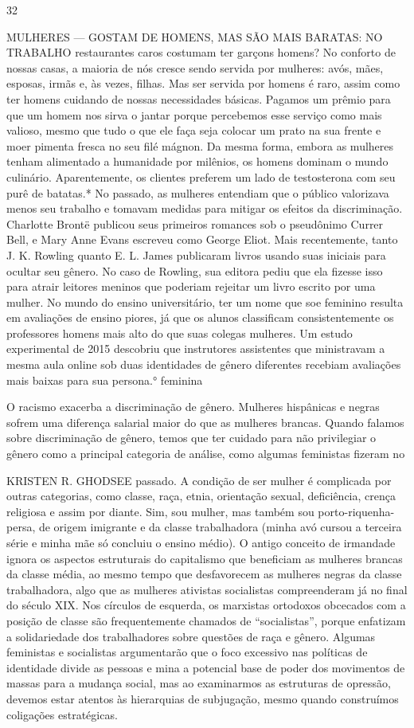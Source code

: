 32
 \par 
MULHERES — GOSTAM DE HOMENS, MAS SÃO MAIS BARATAS: NO TRABALHO restaurantes caros costumam ter garçons homens? No conforto de nossas casas, a maioria de nós cresce sendo servida por mulheres: avós, mães, esposas, irmãs e, às vezes, filhas. Mas ser servida por homens é raro, assim como ter homens cuidando de nossas necessidades básicas. Pagamos um prêmio para que um homem nos sirva o jantar porque percebemos esse serviço como mais valioso, mesmo que tudo o que ele faça seja colocar um prato na sua frente e moer pimenta fresca no seu filé mágnon. Da mesma forma, embora as mulheres tenham alimentado a humanidade por milênios, os homens dominam o mundo culinário. Aparentemente, os clientes preferem um lado de testosterona com seu purê de batatas.* No passado, as mulheres entendiam que o público valorizava menos seu trabalho e tomavam medidas para mitigar os efeitos da discriminação. Charlotte Brontë publicou seus primeiros romances sob o pseudônimo Currer Bell, e Mary Anne Evans escreveu como George Eliot. Mais recentemente, tanto J. K. Rowling quanto E. L. James publicaram livros usando suas iniciais para ocultar seu gênero. No caso de Rowling, sua editora pediu que ela fizesse isso para atrair leitores meninos que poderiam rejeitar um livro escrito por uma mulher. No mundo do ensino universitário, ter um nome que soe feminino resulta em avaliações de ensino piores, já que os alunos classificam consistentemente os professores homens mais alto do que suas colegas mulheres. Um estudo experimental de 2015 descobriu que instrutores assistentes que ministravam a mesma aula online sob duas identidades de gênero diferentes recebiam avaliações mais baixas para sua persona.° feminina
 \par 
O racismo exacerba a discriminação de gênero. Mulheres hispânicas e negras sofrem uma diferença salarial maior do que as mulheres brancas. Quando falamos sobre discriminação de gênero, temos que ter cuidado para não privilegiar o gênero como a principal categoria de análise, como algumas feministas fizeram no
 \par 
KRISTEN R. GHODSEE passado. A condição de ser mulher é complicada por outras categorias, como classe, raça, etnia, orientação sexual, deficiência, crença religiosa e assim por diante. Sim, sou mulher, mas também sou porto-riquenha-persa, de origem imigrante e da classe trabalhadora (minha avó cursou a terceira série e minha mãe só concluiu o ensino médio). O antigo conceito de irmandade ignora os aspectos estruturais do capitalismo que beneficiam as mulheres brancas da classe média, ao mesmo tempo que desfavorecem as mulheres negras da classe trabalhadora, algo que as mulheres ativistas socialistas compreenderam já no final do século XIX. Nos círculos de esquerda, os marxistas ortodoxos obcecados com a posição de classe são frequentemente chamados de “socialistas”, porque enfatizam a solidariedade dos trabalhadores sobre questões de raça e gênero. Algumas feministas e socialistas argumentarão que o foco excessivo nas políticas de identidade divide as pessoas e mina a potencial base de poder dos movimentos de massas para a mudança social, mas ao examinarmos as estruturas de opressão, devemos estar atentos às hierarquias de subjugação, mesmo quando construímos coligações estratégicas.

